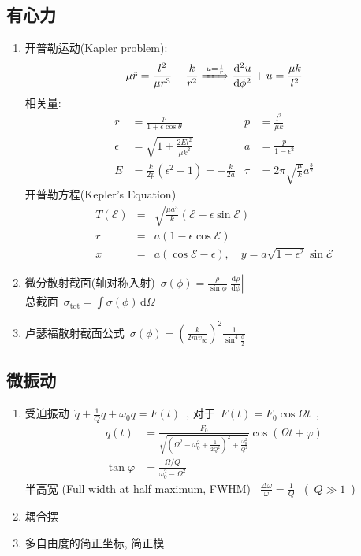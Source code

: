 \documentclass[11pt,a4paper]{article}%
\newcommand{\dif}{\mathrm{d}}
\newcommand{\diff}{\,\mathrm{d}}
\renewcommand{\[}{~$\displaystyle}
\renewcommand{\]}{$~}%
\begin{document}
	\subsection{有心力}
	\begin{enumerate}
	  \item 开普勒运动(Kapler problem):\\
	  	$$\mu\ddot{r} = \frac {l^2}{\mu r^3} - \frac{k}{r^2} \xLongrightarrow{u = \frac 1r} \frac {\dif^2u}{\dif\phi^2} + u = \frac{\mu k}{l^2}$$
	  	相关量:
	  	\begin{align*}
	  	  r &= \frac p{1+\epsilon\cos\theta} & p &= \frac{l^2}{\mu k}\\
	  	  \epsilon &= \sqrt{1+\frac{2El^2}{\mu k^2}} & a &= \frac p{1-\epsilon^2}\\
	  	  E &= \frac k{2p}(\epsilon^2-1) = -\frac k{2a} & \tau &= 2\pi\sqrt{\frac \mu k}a^{\frac 32}
	  	\end{align*}
	  	开普勒方程(Kepler's Equation)
	  	\begin{eqnarray*}
	  	  T(\mathcal{E}) &=& \sqrt{\frac{\mu a^3}k}(\mathcal{E} - \epsilon\sin\mathcal{E})\\
	  	  r &=& a(1 - \epsilon\cos\mathcal{E})\\
	  	  x &=& a(\cos\mathcal{E} - \epsilon),\quad y = a\sqrt{1 - \epsilon^2}\sin\mathcal{E}
	  	\end{eqnarray*}
	  \item 微分散射截面(轴对称入射)\[\sigma(\phi) = \frac \rho{\sin \phi}\left|\frac{\dif\rho}{\dif\phi}\right|\]\\
	  	总截面\[\sigma_{\mbox{tot}} = \int \sigma(\phi)\diff\Omega\]
	  \item 卢瑟福散射截面公式\[\sigma(\phi) = \left(\frac k{2mv_{\infty}}\right)^2\frac 1{\sin^4\frac\phi 2}\]
	\end{enumerate}
	
	\subsection{微振动}
	\begin{enumerate}
	\item 受迫振动\[\ddot q + \frac 1Q \dot q + \omega_0 q = F(t)\], 对于\[F(t) = F_0\cos \Omega t\], 
	  \begin{align*}
	   q(t) &= \frac{F_0}{\sqrt{\left(\Omega^2 - \omega_0^2+\frac 1{2Q^2}\right)^2 + \frac{\omega_0^2}{Q^2}}} \cos(\Omega t + \varphi) \\
	   \tan \varphi &= \frac{\Omega / Q}{\omega_0^2 - \Omega^2}
	  \end{align*}
	  半高宽 (Full width at half maximum, FWHM) \[\frac{\Delta \omega}{\omega} = \frac 1Q\] (\[Q\gg 1\])
	\item 耦合摆
	\item 多自由度的简正坐标, 简正模
	\end{enumerate}
	
\end{document}
